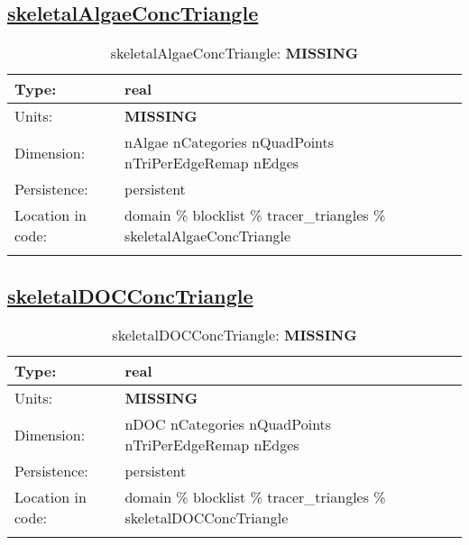 \subsection[skeletalAlgaeConcTriangle]{\hyperref[sec:var_tab_tracer_triangles]{skeletalAlgaeConcTriangle}}
\label{subsec:var_sec_tracer_triangles_skeletalAlgaeConcTriangle}
\begin{center}
\begin{longtable}{| p{2.0in} | p{4.0in} |}
        \hline 
        Type: & real \\
        \hline 
        Units: & {\bf \color{red} MISSING} \\
        \hline 
        Dimension: & nAlgae nCategories nQuadPoints nTriPerEdgeRemap nEdges \\
        \hline 
        Persistence: & persistent \\
        \hline 
         Location in code: & domain \% blocklist \% tracer\_triangles \% skeletalAlgaeConcTriangle \\
         \hline 
    \caption{skeletalAlgaeConcTriangle: {\bf \color{red} MISSING}}
\end{longtable}
\end{center}
\subsection[skeletalDOCConcTriangle]{\hyperref[sec:var_tab_tracer_triangles]{skeletalDOCConcTriangle}}
\label{subsec:var_sec_tracer_triangles_skeletalDOCConcTriangle}
\begin{center}
\begin{longtable}{| p{2.0in} | p{4.0in} |}
        \hline 
        Type: & real \\
        \hline 
        Units: & {\bf \color{red} MISSING} \\
        \hline 
        Dimension: & nDOC nCategories nQuadPoints nTriPerEdgeRemap nEdges \\
        \hline 
        Persistence: & persistent \\
        \hline 
         Location in code: & domain \% blocklist \% tracer\_triangles \% skeletalDOCConcTriangle \\
         \hline 
    \caption{skeletalDOCConcTriangle: {\bf \color{red} MISSING}}
\end{longtable}
\end{center}
